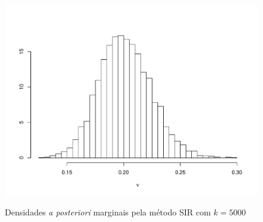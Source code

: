 \documentclass[9pt]{beamer}
\begin{document}
\begin{frame}
\begin{figure}[t]
{{\includegraphics[scale=0.2]{figuras/nu_sir_5000.pdf}}}%
\caption{Densidades \textit{a posteriori} marginais pela método SIR com $k = 5000$}%
\end{figure}
\end{frame}
\end{document}
